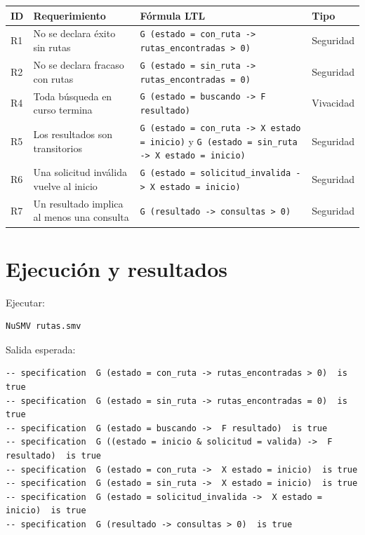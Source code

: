 \documentclass[11pt,a4paper]{article}
\begin{document}
\begin{center}
\begin{tabular}{|l|p{5.4cm}|p{5.4cm}|l|}
\hline
\textbf{ID} & \textbf{Requerimiento} & \textbf{Fórmula LTL} & \textbf{Tipo} \\
\hline
R1 & No se declara éxito sin rutas & \texttt{G (estado = con\_ruta -> rutas\_encontradas > 0)} & Seguridad \\
\hline
R2 & No se declara fracaso con rutas & \texttt{G (estado = sin\_ruta -> rutas\_encontradas = 0)} & Seguridad \\
\hline
R4 & Toda búsqueda en curso termina & \texttt{G (estado = buscando -> F resultado)} & Vivacidad \\
\hline
R5 & Los resultados son transitorios & \texttt{G (estado = con\_ruta -> X estado = inicio)} y \texttt{G (estado = sin\_ruta -> X estado = inicio)} & Seguridad \\
\hline
R6 & Una solicitud inválida vuelve al inicio & \texttt{G (estado = solicitud\_invalida -> X estado = inicio)} & Seguridad \\
\hline
R7 & Un resultado implica al menos una consulta & \texttt{G (resultado -> consultas > 0)} & Seguridad \\
\hline
\end{tabular}
\end{center}

\section{Ejecución y resultados}

Ejecutar:

\begin{lstlisting}
NuSMV rutas.smv
\end{lstlisting}

Salida esperada:

\begin{lstlisting}
-- specification  G (estado = con_ruta -> rutas_encontradas > 0)  is true
-- specification  G (estado = sin_ruta -> rutas_encontradas = 0)  is true
-- specification  G (estado = buscando ->  F resultado)  is true
-- specification  G ((estado = inicio & solicitud = valida) ->  F resultado)  is true
-- specification  G (estado = con_ruta ->  X estado = inicio)  is true
-- specification  G (estado = sin_ruta ->  X estado = inicio)  is true
-- specification  G (estado = solicitud_invalida ->  X estado = inicio)  is true
-- specification  G (resultado -> consultas > 0)  is true
\end{lstlisting}
\end{document}
